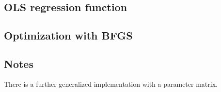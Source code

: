 \documentclass[12pt,letterpaper]{article}
\begin{document}
\subsection*{OLS regression function } 

  

\subsection*{Optimization with BFGS} 

  



\subsection*{Notes}

\noindent  There is a further generalized implementation with a parameter matrix.

  
\end{document}
